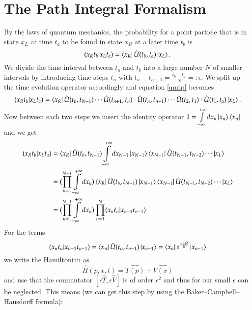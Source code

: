 \section{The Path Integral Formalism}

By the laws of quantum mechanics, the probability for a point particle that is in state $x_L$ at time $t_a$ to be found in state $x_R$ at a later time $t_b$ is
\begin{equation} \label{qmtp}
  (x_R t_b | x_L t_a) = \bra{x_R}\hat{U}(t_b,t_a)\ket{x_L}.
\end{equation}
We divide the time interval between $t_a$ and $t_b$ into a large number $N$ of smaller intervals by introducing time steps $t_n$ with $t_n -t_{n-1} = \frac{t_b - t_a}{N} =:\epsilon$. We split up the time evolution operator accordingly and equation \ref{qmtp} becomes
\begin{equation} \label{qmtpn}
  (x_R t_b | x_L t_a) = \bra{x_R}\hat{U}(t_b,t_{N-1}) \cdots \hat{U}(t_{n+1},t_n)\cdot\hat{U}(t_n,t_{n-1}) \cdots \hat{U}(t_2,t_1)\cdot\hat{U}(t_1,t_a)\ket{x_L}.
\end{equation}
Now between each two steps we insert the identity operator $1 = \int\limits_{-\infty}^{+\infty} dx_n \ket{x_n}\bra{x_n}$ and we get 
\begin{align}
  (x_R t_b | x_L t_a) &=  \bra{x_R}\hat{U}(t_b,t_{N-1}) \int\limits_{-\infty}^{+\infty} dx_{N-1} \ket{x_{N-1}}\bra{x_{N-1}} \hat{U}(t_{N-1},t_{N-2}) \cdots \ket{x_L} \\
                      &=  (\prod_{n=1}^{N-1} \int\limits_{-\infty}^{+\infty} dx_{n}) \bra{x_R}\hat{U}(t_b,t_{N-1})  \ket{x_{N-1}}\bra{x_{N-1}} \hat{U}(t_{N-1},t_{N-2}) \cdots \ket{x_L} \\
                      &=  (\prod_{n=1}^{N-1} \int\limits_{-\infty}^{+\infty} dx_{n})\prod_{n=1}^{N} (x_n t_n | x_{n-1} t_{n-1}) \label{tpi}
\end{align}
For the terms 
\begin{equation}\label{tpn}
  (x_n t_n | x_{n-1} t_{n-1}) = \bra{x_n} \hat{U}(t_{n},t_{n-1}) \ket{x_{n-1}} = \bra{x_n} e^{\frac{-i \epsilon \hat{H}}{\hbar}} \ket{x_{n-1}} 
\end{equation}
we write the Hamiltonian as
\begin{equation}\label{HTV}
  \hat{H}(p,x,t) = \hat{T(p)} + \hat{V(x)}
\end{equation}
and use that the commutator $[\epsilon \hat{T}, \epsilon \hat{V}]$ is of order $\epsilon^2$ and thus for our small $\epsilon$ can be neglected. This means (we can get this step by using the Baker–Campbell–Hausdorff formula):
